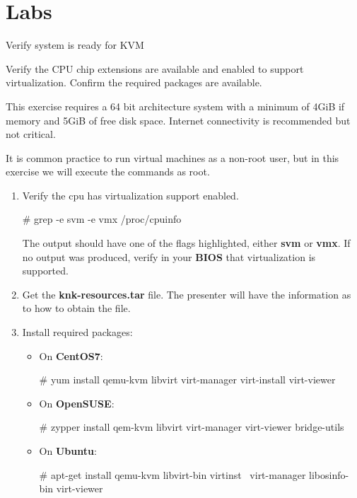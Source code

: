 \clearpage\section{Labs}\begin{Lab}

\begin{exe} {Verify system is ready for KVM }

   Verify the CPU chip extensions are available and enabled to support virtualization. 
   Confirm the required packages are available. 

   This exercise requires a 64 bit architecture system with a minimum of 4GiB 
	if memory and 5GiB of
	free disk space. Internet connectivity is recommended but not critical. 

   It is common practice to run virtual machines as a non-root user, but in this
   exercise we will execute the commands as root.

   \begin{sol}
      \begin{enumerate}
         \item	Verify the cpu has virtualization support enabled.
		 \begin{raw}
# grep -e svm -e vmx /proc/cpuinfo 
		\end{raw} 
		      The output should have one of the flags highlighted, either 
		      \textbf{svm} or \textbf{vmx}. If no output was produced, verify 
		      in your \textbf{BIOS} that virtualization is supported. 
		  
	\item Get the \textbf{knk-resources.tar} file. The presenter will 
		have the information as to how to obtain the file. 
	  \item Install required packages:		      
         \begin{itemize}
            \item
            On \textbf{CentOS7}:
            \begin{raw}
# yum install qemu-kvm libvirt virt-manager virt-install virt-viewer 
	    \end{raw}
            \item
            On \textbf{OpenSUSE}:
            \begin{raw}
# zypper install qem-kvm libvirt virt-manager virt-viewer bridge-utils 
            \end{raw}
            \item
            On \textbf{Ubuntu}:
            \begin{raw}
# apt-get install qemu-kvm libvirt-bin virtinst \
		    virt-manager libosinfo-bin virt-viewer 
            \end{raw}
         \end{itemize}


\end{enumerate}
\end{sol}
\end{exe}
\end{Lab}
